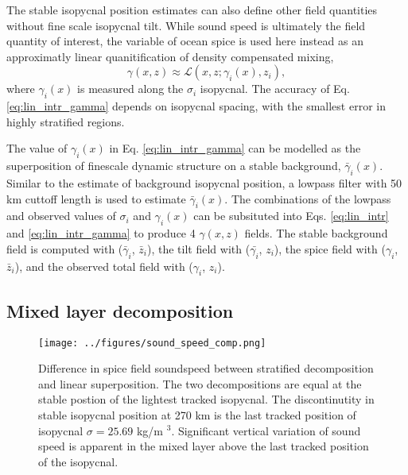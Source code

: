 \documentclass[preprint,NumberedRefs]{JASA}
\begin{document}
The stable isopycnal position estimates can also define other field quantities without fine scale isopycnal tilt. While sound speed is ultimately the field quantity of interest, the variable of ocean spice is used here instead as an approximatly linear quanitification of density compensated mixing,
\begin{equation}
    \gamma(x, z)\approx\mathcal{L}(x, z; \gamma_i(x), z_i),
    \label{eq:lin_intr_gamma}
\end{equation}
where $\gamma_i(x)$ is measured along the $\sigma_i$ isopycnal. The accuracy of Eq. \eqref{eq:lin_intr_gamma} depends on isopycnal spacing, with the smallest error in highly stratified regions.

The value of $\gamma_i(x)$ in Eq. \eqref{eq:lin_intr_gamma} can be modelled as the superposition of finescale dynamic structure on a stable background, $\bar{\gamma}_i(x)$. Similar to the estimate of background isopycnal position, a lowpass filter with 50 km cuttoff length is used to estimate $\bar{\gamma}_i(x)$. The combinations of the lowpass and observed values of $\sigma_i$ and $\gamma_i(x)$ can be subsituted into Eqs. \eqref{eq:lin_intr} and \eqref{eq:lin_intr_gamma} to produce 4 $\gamma(x,z)$ fields. The stable background field is computed with ($\bar{\gamma}_i$, $\bar{z}_i$), the tilt field with ($\bar{\gamma_i}$, $z_i$), the spice field with ($\gamma_i$, $\bar{z}_i$), and the observed total field with ($\gamma_i$, $z_i$).


\subsection{Mixed layer decomposition}
\begin{figure}
\texttt{[image: ../figures/sound\_speed\_comp.png]}
    \caption{\label{fig:c_diff}{Difference in spice field soundspeed between stratified decomposition and linear superposition. The two decompositions are equal at the stable postion of the lightest tracked isopycnal. The discontinutity in stable isopycnal position at 270 km is the last tracked position of isopycnal $\sigma=25.69$ kg/m $^3$. Significant vertical variation of sound speed is apparent in the mixed layer above the last tracked position of the isopycnal.}}
\end{figure}
\end{document}
